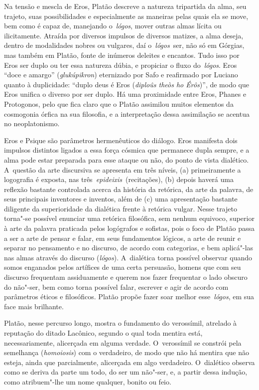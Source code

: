 Na tensão e mescla de Eros, Platão descreve a natureza tripartida da
alma, seu trajeto, suas possibilidades e especialmente as maneiras pelas
quais ela se move, bem como é capaz de, manejando o~\emph{lógos}, mover
outras almas lícita ou ilicitamente. Atraída por diversos impulsos de
diversos matizes, a alma deseja, dentro de modalidades nobres ou
vulgares, daí o~\emph{lógos}~ser, não só em Górgias, mas também em
Platão, fonte de inúmeros deleites e encantos. Tudo isso por Eros ser
duplo ou ter essa natureza dúbia, e propiciar o fluxo do~\emph{lógos}.
Eros ``doce e amargo'' (\emph{glukúpikron}) eternizado por Safo e
reafirmado por Luciano quanto à duplicidade: ``duplo deus é Eros
(\emph{diploûs theòs ho Érôs})'', de modo que Eros unifica o diverso por
ser duplo. Há uma proximidade entre Eros, Phanes e Protogonos, pelo que
fica claro que o Platão assimilou muitos elementos da cosmogonia órfica
na sua filosofia, e a interpretação dessa assimilação se acentua no
neoplatonismo.

Eros e Psique são parâmetros hermenêuticos do diálogo. Eros manifesta
dois impulsos distintos ligados a essa força cósmica que permanece dupla
sempre, e a alma pode estar preparada para esse ataque ou não, do ponto
de vista dialético. A~questão da arte discursiva se apresenta em três
níveis, (a) primeiramente a logografia é exposta, nas
três~\emph{epideixis~}(recitações), (b) depois haverá uma reflexão
bastante controlada acerca da história da retórica, da arte da palavra,
de seus principais inventores e inventos, além de (c) uma apresentação
bastante diligente da superioridade da dialética frente à retórica
vulgar. Nesse trajeto torna"-se possível enunciar uma retórica
filosófica, sem nenhum equivoco, superior à arte da palavra praticada
pelos logógrafos e sofistas, pois o foco de Platão passa a ser a arte de
pensar e falar, em seus fundamentos lógicos, a arte de reunir e separar
no pensamento e no discurso, de acordo com categorias, e bem aplicá"-las
nas almas através do discurso (\emph{lógos}). A~dialética torna possível
observar quando somos enganados pelos artífices de uma certa persuasão,
homens que com seu discurso frequentam assiduamente e querem nos fazer
frequentar o lado obscuro do não"-ser, bem como torna possível falar,
escrever e agir de acordo com parâmetros éticos e filosóficos. Platão
propõe fazer soar melhor esse~\emph{lógos}, em sua face mais brilhante.

Platão, nesse percurso longo, mostra o fundamento do verossímil,
atrelado à reputação do ditado Lacônico, segundo o qual toda mentira
está, necessariamente, alicerçada em alguma verdade. O~verossímil se
constrói pela semelhança (\emph{homoiosis}) com o verdadeiro, de modo
que não há mentira que não esteja, ainda que parcialmente, alicerçada em
algo verdadeiro. O~dialético observa como se deriva da parte um todo, do
ser um não"-ser, e, a partir dessa indução, como atribuem"-lhe um nome
qualquer, bonito ou feio.

